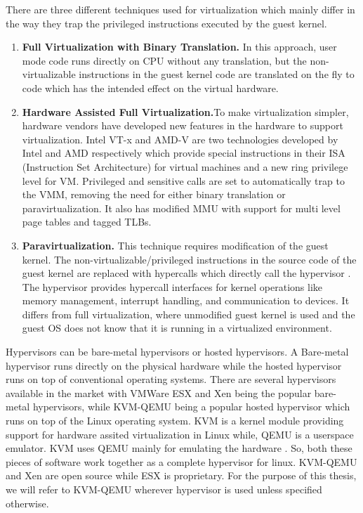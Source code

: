 There are three different techniques used for virtualization \cite{horne2007understanding} which mainly differ in the way they trap the privileged instructions executed by the guest kernel.

\begin{enumerate}
\item \textbf{Full Virtualization with Binary Translation.} In this approach, user mode code runs directly on CPU without any translation, but the non-virtualizable instructions \cite{Popek:1974:FRV:361011.361073} in the guest kernel code are translated on the fly to code which has the intended effect on the virtual hardware.

\item \textbf{Hardware Assisted Full Virtualization.}To make virtualization simpler, hardware vendors have developed new features in the hardware to support virtualization. Intel VT-x and AMD-V are two technologies developed by Intel and AMD respectively which provide special instructions in their ISA (Instruction Set Architecture) for virtual machines and a new ring privilege level for VM. Privileged and sensitive calls are set to automatically trap to the VMM, removing the need for either binary translation or paravirtualization. It also has modified MMU with support for multi level page tables \cite{bhargava2008accelerating} and tagged TLBs. 

\item \textbf{Paravirtualization.} This technique requires modification of the guest kernel. The non-virtualizable/privileged instructions in the source code of the guest kernel are replaced with hypercalls which directly call the hypervisor \cite{barham2003xen}. The hypervisor provides hypercall interfaces for kernel operations like memory management, interrupt handling, and communication to devices. It differs from full virtualization, where unmodified guest kernel is used and the guest OS does not know that it is running in a virtualized environment.  
\end{enumerate}


Hypervisors can be bare-metal hypervisors or hosted hypervisors. A Bare-metal
hypervisor runs directly on the physical hardware while the hosted hypervisor runs
on top of conventional operating systems. There are several hypervisors available
in the market with VMWare ESX and Xen \cite{barham2003xen} being the popular bare-metal hypervisors,
while KVM-QEMU \cite{kivity2007kvm, bellard2005qemu} being a popular hosted hypervisor which runs on top of the Linux
operating system. KVM is a kernel module providing support for hardware assited virtualization in Linux while, QEMU is a userspace emulator. KVM uses QEMU mainly for emulating the hardware \cite{Habib:2008:VK:1344209.1344217}. So, both these pieces of software work together as a complete hypervisor for linux. KVM-QEMU and Xen are open source while ESX is proprietary. For the
purpose of this thesis, we will refer to KVM-QEMU wherever hypervisor is used unless specified otherwise.

